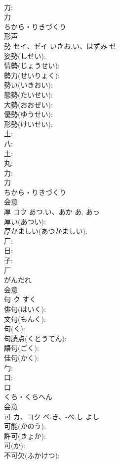 \documentclass[8pt]{extreport}
\begin{document}
\begin{CJK}{UTF8}{min}
\\	力: 
\\	力	
\\	ちから・りきづくり	
\\	形声 
\\	勢	セイ、ゼイ	いきお.い、はずみ	せ	
\\	姿勢(しせい): 
\\	情勢(じょうせい): 
\\	勢力(せいりょく): 
\\	勢い(いきおい): 
\\	態勢(たいせい): 
\\	大勢(おおぜい): 
\\	優勢(ゆうせい): 
\\	形勢(けいせい): 
\\	土: 
\\	八: 
\\	土: 
\\	丸: 
\\	力: 
\\	力	
\\	ちから・りきづくり	
\\	会意 
\\	厚	コウ	あつ.い、あか	あ, あっ	
\\	厚い(あつい): 
\\	厚かましい(あつかましい): 
\\	厂: 
\\	日: 
\\	子: 
\\	厂	
\\	がんだれ	
\\	会意 
\\	句	ク		すく	
\\	俳句(はいく): 
\\	文句(もんく): 
\\	句(く): 
\\	句読点(くとうてん): 
\\	語句(ごく): 
\\	佳句(かく): 
\\	勹: 
\\	口: 
\\	口	
\\	くち・くちへん	
\\	会意 
\\	可	カ、コク	べ.き、-べ.し	よし	
\\	可能(かのう): 
\\	許可(きょか): 
\\	可(か): 
\\	不可欠(ふかけつ): 

\end{CJK}
\end{document}
